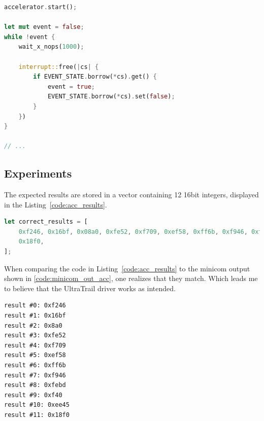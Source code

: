 \begin{lstlisting}[style=colorEX,language=Rust,caption={Snippet of the busy wait that waits for UltraTrail to finish},label={code:busy_wait}]
accelerator.start();

let mut event = false;
while !event {
    wait_x_nops(1000);

    interrupt::free(|cs| {
        if EVENT_STATE.borrow(*cs).get() {
            event = true;
            EVENT_STATE.borrow(*cs).set(false);
        }
    })
}

// ...
\end{lstlisting}

\subsection{Experiments}

The expected results are stored in a vector containing 12 16bit integers, displayed in the Listing~\ref{code:acc_results}.

\begin{lstlisting}[style=colorEX,language=Rust,caption={The expected results from the driver test},label={code:acc_results}]
let correct_results = [
    0xf246, 0x16bf, 0x08a0, 0xfe52, 0xf709, 0xef58, 0xff6b, 0xf946, 0xfebd, 0x0f40, 0xee45,
    0x18f0,
];
\end{lstlisting}

When comparing the code in Listing~\ref{code:acc_results} to the minicom output shown in \ref{code:minicom_out_acc},
one realizes that they match. Which leads me to believe that the UltraTrail driver works as intended.

\begin{lstlisting}[style=colorEx,caption={Minicom output after executing the driver test},label={code:minicom_out_acc}]
result #0: 0xf246
result #1: 0x16bf
result #2: 0x8a0
result #3: 0xfe52
result #4: 0xf709
result #5: 0xef58
result #6: 0xff6b
result #7: 0xf946
result #8: 0xfebd
result #9: 0xf40
result #10: 0xee45
result #11: 0x18f0
\end{lstlisting}



